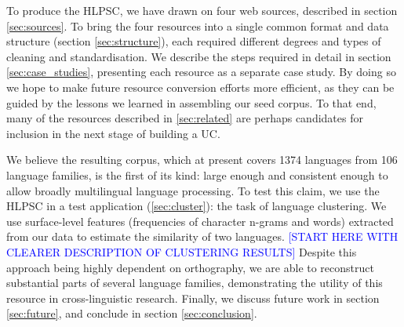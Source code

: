 To produce the HLPSC, we have drawn on four web sources, described in section \ref{sec:sources}. To bring the four resources into a single common format and data structure (section \ref{sec:structure}), each required different degrees and types of cleaning and standardisation. We describe the steps required in detail in section \ref{sec:case_studies}, presenting each resource as a separate case study. By doing so we hope to make future resource conversion efforts more efficient, as they can be guided by the lessons we learned in assembling our seed corpus. To that end, many of the resources described in \ref{sec:related} are perhaps candidates for inclusion in the next stage of building a UC.

We believe the resulting corpus, which at present covers 1374 languages from 106 language families, is the first of its kind: large enough and consistent enough to allow broadly multilingual language processing. To test this claim, we use the HLPSC in a test application (\ref{sec:cluster}): the task of language clustering. We use surface-level features (frequencies of character n-grams and words) extracted from our data to estimate the similarity of two languages.  \textcolor{blue}{[START HERE WITH CLEARER DESCRIPTION OF CLUSTERING RESULTS]}
Despite this approach being highly dependent on orthography, we are able to reconstruct substantial parts of several language families, demonstrating the utility of this resource in cross-linguistic research. Finally, we discuss future work in section \ref{sec:future}, and conclude in section \ref{sec:conclusion}.






